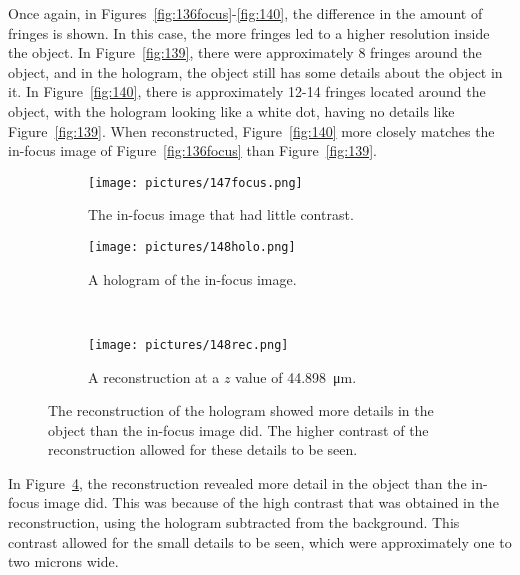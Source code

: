 Once again, in Figures~\ref{fig:136focus}-\ref{fig:140}, the difference in the
amount of fringes is shown. In this case, the more fringes led to a higher
resolution inside the object. In Figure~\ref{fig:139}, there were approximately
8 fringes around the object, and in the hologram, the object still has some
details about the object in it. In Figure~\ref{fig:140}, there is approximately
12-14 fringes located around the object, with the hologram looking like a white
dot, having no details like Figure~\ref{fig:139}. When reconstructed,
Figure~\ref{fig:140} more closely matches the in-focus image of
Figure~\ref{fig:136focus} than Figure~\ref{fig:139}.


\begin{figure}[ht!]
    \begin{center}

        \begin{subfigure}[t]{0.4\textwidth}
            \label{fig:147focus}
            \texttt{[image: pictures/147focus.png]}
            \caption{The in-focus image that had little contrast.}
        \end{subfigure}
        \hspace*{\fill}
        \begin{subfigure}[t]{0.4\textwidth}
            \label{fig:148holo}
            \texttt{[image: pictures/148holo.png]}
            \caption{A hologram of the in-focus image.}
        \end{subfigure}
        \\
        \begin{subfigure}[t]{\textwidth}
            \label{fig:148rec}
            \texttt{[image: pictures/148rec.png]}
            \caption{A reconstruction at a $z$ value of
                \SI{44.898}{\micro\meter}.}
        \end{subfigure}


    \end{center}
    \caption{%
        The reconstruction of the hologram showed more details in the object
        than the in-focus image did. The higher contrast of the reconstruction
        allowed for these details to be seen.
    }%
    \label{fig:148}
\end{figure}
\clearpage

In Figure~\ref{fig:148}, the reconstruction revealed more detail in the object
than the in-focus image did. This was because of the high contrast that was
obtained in the reconstruction, using the hologram subtracted from the
background. This contrast allowed for the small details to be seen, which were
approximately one to two microns wide.

